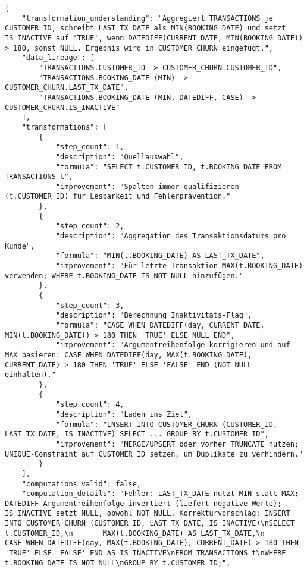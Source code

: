 \begin{lstlisting}[caption={Ausgabe: GPT-5 Anwendungsfall 7 Hauptdurchlauf},label={gpt_case7_prompt1}]
{
    "transformation_understanding": "Aggregiert TRANSACTIONS je CUSTOMER_ID, schreibt LAST_TX_DATE als MIN(BOOKING_DATE) und setzt IS_INACTIVE auf 'TRUE', wenn DATEDIFF(CURRENT_DATE, MIN(BOOKING_DATE)) > 180, sonst NULL. Ergebnis wird in CUSTOMER_CHURN eingefügt.",
    "data_lineage": [
        "TRANSACTIONS.CUSTOMER_ID -> CUSTOMER_CHURN.CUSTOMER_ID",
        "TRANSACTIONS.BOOKING_DATE (MIN) -> CUSTOMER_CHURN.LAST_TX_DATE",
        "TRANSACTIONS.BOOKING_DATE (MIN, DATEDIFF, CASE) -> CUSTOMER_CHURN.IS_INACTIVE"
    ],
    "transformations": [
        {
            "step_count": 1,
            "description": "Quellauswahl",
            "formula": "SELECT t.CUSTOMER_ID, t.BOOKING_DATE FROM TRANSACTIONS t",
            "improvement": "Spalten immer qualifizieren (t.CUSTOMER_ID) für Lesbarkeit und Fehlerprävention."
        },
        {
            "step_count": 2,
            "description": "Aggregation des Transaktionsdatums pro Kunde",
            "formula": "MIN(t.BOOKING_DATE) AS LAST_TX_DATE",
            "improvement": "Für letzte Transaktion MAX(t.BOOKING_DATE) verwenden; WHERE t.BOOKING_DATE IS NOT NULL hinzufügen."
        },
        {
            "step_count": 3,
            "description": "Berechnung Inaktivitäts-Flag",
            "formula": "CASE WHEN DATEDIFF(day, CURRENT_DATE, MIN(t.BOOKING_DATE)) > 180 THEN 'TRUE' ELSE NULL END",
            "improvement": "Argumentreihenfolge korrigieren und auf MAX basieren: CASE WHEN DATEDIFF(day, MAX(t.BOOKING_DATE), CURRENT_DATE) > 180 THEN 'TRUE' ELSE 'FALSE' END (NOT NULL einhalten)."
        },
        {
            "step_count": 4,
            "description": "Laden ins Ziel",
            "formula": "INSERT INTO CUSTOMER_CHURN (CUSTOMER_ID, LAST_TX_DATE, IS_INACTIVE) SELECT ... GROUP BY t.CUSTOMER_ID",
            "improvement": "MERGE/UPSERT oder vorher TRUNCATE nutzen; UNIQUE-Constraint auf CUSTOMER_ID setzen, um Duplikate zu verhindern."
        }
    ],
    "computations_valid": false,
    "computation_details": "Fehler: LAST_TX_DATE nutzt MIN statt MAX; DATEDIFF-Argumentreihenfolge invertiert (liefert negative Werte); IS_INACTIVE setzt NULL, obwohl NOT NULL. Korrekturvorschlag: INSERT INTO CUSTOMER_CHURN (CUSTOMER_ID, LAST_TX_DATE, IS_INACTIVE)\nSELECT t.CUSTOMER_ID,\n       MAX(t.BOOKING_DATE) AS LAST_TX_DATE,\n       CASE WHEN DATEDIFF(day, MAX(t.BOOKING_DATE), CURRENT_DATE) > 180 THEN 'TRUE' ELSE 'FALSE' END AS IS_INACTIVE\nFROM TRANSACTIONS t\nWHERE t.BOOKING_DATE IS NOT NULL\nGROUP BY t.CUSTOMER_ID;",

\end{lstlisting}

